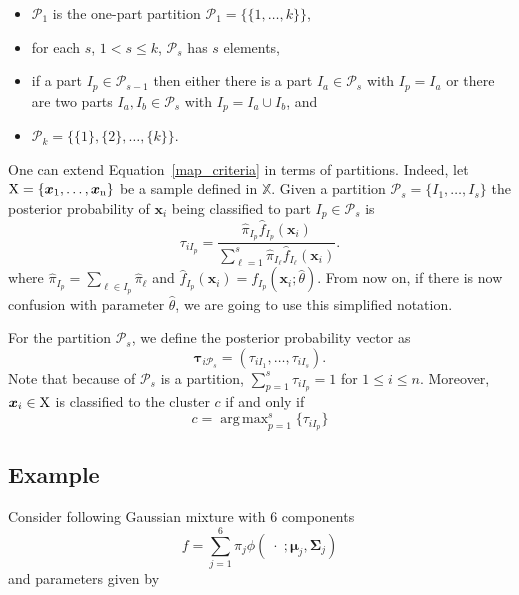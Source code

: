 \documentclass[10pt, a4paper]{article}
\DeclareMathOperator*{\argmax}{arg\,max}
\newcommand{\m}[1]{\boldsymbol{#1}}
\begin{document}
\begin{spacing}{1.9}
\begin{itemize}
\item $\mathcal{P}_1$ is the one-part partition $\mathcal{P}_1 = \{ \{1, \dots, k\} \}$,
\item for each $s$, $1 <  s \leq k$, $\mathcal{P}_{s}$ has $s$ elements,
\item if a part $I_p \in \mathcal{P}_{s-1}$ then either there is a part $I_a \in \mathcal{P}_{s}$ with $I_p = I_a$ or there are two parts $I_a, I_b \in \mathcal{P}_s$ with $I_p = I_a \cup I_b$, and
\item $\mathcal{P}_k= \{ \{1\},\{2\}, \dots, \{k\} \}$.
\end{itemize}



One can extend Equation~\ref{map_criteria} in terms of partitions. Indeed, let $\rm X = \{\m x_1,\dots, \m x_n\}$ be a sample defined in $\mathbb{X}$. Given a partition $\mathcal{P}_s = \{ I_1, \dots, I_s \}$ the posterior probability of $\m x_i$ being classified to part $I_p\in \mathcal{P}_{s}$ is
\[
\tau_{i I_p} =  \frac{ \hat{\pi}_{I_p} \hat{f}_{I_p}(\m x_i) }{\sum_{\ell=1}^s \hat{\pi}_{I_\ell} \hat{f}_{I_\ell}(\m x_i)}.
\]
where $\hat{\pi}_{I_p} = \sum_{\ell \in I_p} \hat{\pi}_\ell$ and $\hat{f}_{I_p}(\m x_i) = f_{I_p}(\m x_i; \hat{\theta})$. From now on, if there is now confusion with parameter $\hat{\theta}$, we are going to use this simplified notation. 

For the partition  $\mathcal{P}_s$, we define the posterior probability vector as
\begin{equation}\label{ppv}
\m\tau_{i \mathcal{P}_s} = \left(\tau_{i I_1} , \dots, \tau_{i I_s}  \right).
\end{equation}
Note that because of $\mathcal{P}_s$ is a partition, $\sum_{p=1}^s \tau_{i I_p} = 1$ for $1 \leq i \leq n$.
Moreover, $\m x_i \in \rm X$ is classified to the cluster $c$ if and only if
\begin{equation}\label{cluster_criteria}
c= \argmax_{p=1}^s \{ \tau_{i I_p} \}
\end{equation}

\subsection{Example}

Consider following Gaussian mixture with 6 components
\[
f= \sum_{j=1}^6 \pi_j \phi(\;\cdot\; ;  \m\mu_j, \m\Sigma_j)
\]
and parameters given by
{\small  }


\end{spacing}
\end{document}
